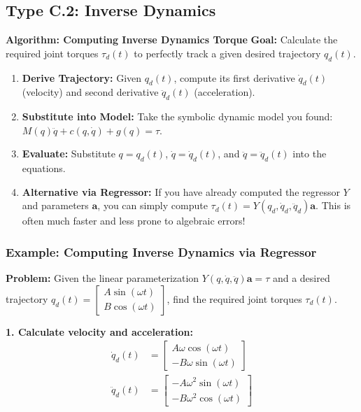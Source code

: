 \documentclass[11pt,a4paper]{article}
\begin{document}
\subsection{Type C.2: Inverse Dynamics}

 \textbf{Algorithm: Computing Inverse Dynamics Torque}
\textbf{Goal:} Calculate the required joint torques $\tau_d(t)$ to perfectly track a given desired trajectory $q_d(t)$.
\begin{enumerate}
    \item \textbf{Derive Trajectory:} Given $q_d(t)$, compute its first derivative $\dot{q}_d(t)$ (velocity) and second derivative $\ddot{q}_d(t)$ (acceleration).
    \item \textbf{Substitute into Model:} Take the symbolic dynamic model you found: $M(q)\ddot{q} + c(q,\dot{q}) + g(q) = \tau$.
    \item \textbf{Evaluate:} Substitute $q = q_d(t)$, $\dot{q} = \dot{q}_d(t)$, and $\ddot{q} = \ddot{q}_d(t)$ into the equations.
    \item \textbf{Alternative via Regressor:} If you have already computed the regressor $Y$ and parameters $\mathbf{a}$, you can simply compute $\tau_d(t) = Y(q_d, \dot{q}_d, \ddot{q}_d)\mathbf{a}$. This is often much faster and less prone to algebraic errors!
\end{enumerate}

\subsubsection{Example: Computing Inverse Dynamics via Regressor}

 \textbf{Problem:} Given the linear parameterization $Y(q, \dot{q}, \ddot{q})\mathbf{a} = \tau$ and a desired trajectory $q_d(t) = \begin{bmatrix} A \sin(\omega t) \\ B \cos(\omega t) \end{bmatrix}$, find the required joint torques $\tau_d(t)$.
\vspace{0.2cm}

\textbf{1. Calculate velocity and acceleration:}
\begin{align*}
    \dot{q}_d(t) &= \begin{bmatrix} A \omega \cos(\omega t) \\ -B \omega \sin(\omega t) \end{bmatrix} \\
    \ddot{q}_d(t) &= \begin{bmatrix} -A \omega^2 \sin(\omega t) \\ -B \omega^2 \cos(\omega t) \end{bmatrix}
\end{align*}
\end{document}
